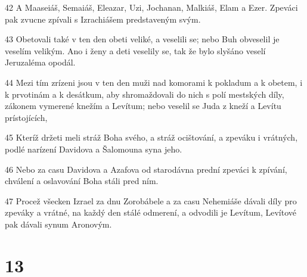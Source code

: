 \par 42 A Maaseiáš, Semaiáš, Eleazar, Uzi, Jochanan, Malkiáš, Elam a Ezer. Zpeváci pak zvucne zpívali s Izrachiášem predstaveným svým.
\par 43 Obetovali také v ten den obeti veliké, a veselili se; nebo Buh obveselil je veselím velikým. Ano i ženy a deti veselily se, tak že bylo slyšáno veselí Jeruzaléma opodál.
\par 44 Mezi tím zrízeni jsou v ten den muži nad komorami k pokladum a k obetem, i k prvotinám a k desátkum, aby shromaždovali do nich s polí mestských díly, zákonem vymerené knežím a Levítum; nebo veselil se Juda z kneží a Levítu prístojících,
\par 45 Kteríž držeti meli stráž Boha svého, a stráž ocištování, a zpeváku i vrátných, podlé narízení Davidova a Šalomouna syna jeho.
\par 46 Nebo za casu Davidova a Azafova od starodávna prední zpeváci k zpívání, chválení a oslavování Boha stáli pred ním.
\par 47 Procež všecken Izrael za dnu Zorobábele a za casu Nehemiáše dávali díly pro zpeváky a vrátné, na každý den stálé odmerení, a odvodili je Levítum, Levítové pak dávali synum Aronovým.

\chapter{13}

